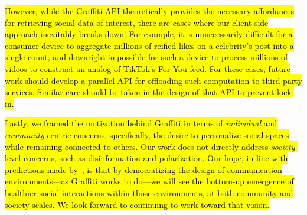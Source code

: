\hl{%
However, while the Graffiti API theoretically provides the necessary
affordances for retrieving social data of interest,
there are cases where our client-side approach inevitably breaks down.
For example, it is unnecessarily difficult for a consumer device to
aggregate millions of reified likes on a celebrity's post into a single count, and
downright impossible for such a device to
process millions of videos to construct an analog of TikTok's For You feed.
For these cases, future work should develop
a parallel API for offloading such
computation to third-party services.
Similar care should be taken
in the design of that API to prevent lock-in.
}%

\hl{%
Lastly, we framed the motivation behind Graffiti in terms of
\emph{individual} and \emph{community}-centric concerns,
specifically, the desire to personalize social spaces while remaining connected to others.
Our work does not directly address \emph{society}-level concerns,
such as disinformation and polarization.
Our hope, in line with predictions made by~{\cite{threeleggedstool}}, is that by democratizing
the design of communication environments---as Graffiti works to do---we
will see the bottom-up emergence of healthier social interactions within those environments,
at both community and society scales.
We look forward to continuing to work toward that vision.
}%













